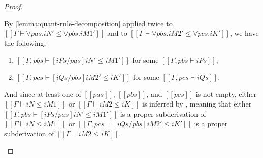 \begin{corollary}
\begin{proof}
\begin{caseof}
      By \cref{lemma:quant-rule-decomposition} applied twice
      to $[[Γ ⊢ ∀pas.iN' ≤ ∀pbs.iM1']]$ and to $[[Γ ⊢ ∀pbs.iM2' ≤ ∀pcs.iK']]$,
      we have the following:
      \begin{enumerate}
        \item $[[Γ, pbs ⊢ [iPs/pas]iN' ≤ iM1']]$ for some $[[Γ, pbs ⊢ iPs]]$;
        \item $[[Γ, pcs ⊢ [iQs/pbs]iM2' ≤ iK']]$ for some $[[Γ, pcs ⊢ iQs]]$.
      \end{enumerate}
      And since at least one of 
      $[[pas]]$, $[[pbs]]$, and $[[pcs]]$ is not empty,
      either $[[Γ ⊢ iN ≤ iM1]]$ or $[[Γ ⊢ iM2 ≤ iK]]$ is inferred 
      by , meaning that either 
      $[[Γ, pbs ⊢ [iPs/pas]iN' ≤ iM1']]$ is a proper subderivation of $[[Γ ⊢ iN ≤ iM1]]$ or
      $[[Γ, pcs ⊢ [iQs/pbs]iM2' ≤ iK']]$ is a proper subderivation of $[[Γ ⊢ iM2 ≤ iK]]$.


\end{caseof}
\end{proof}
\end{corollary}
